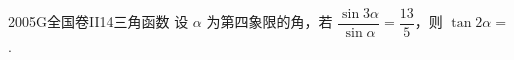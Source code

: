
\begin{problem}{2005}{G}{全国卷II}{14}{三角函数}
设 $\alpha$ 为第四象限的角，若 $\dfrac{\sin 3\alpha}{\sin\alpha}=\dfrac{13}{5}$，则 $ \tan 2\alpha= $\underline{\hspace{4em}}.
\end{problem}

\begin{answer}

\end{answer}

\begin{solutions}

\end{solutions}